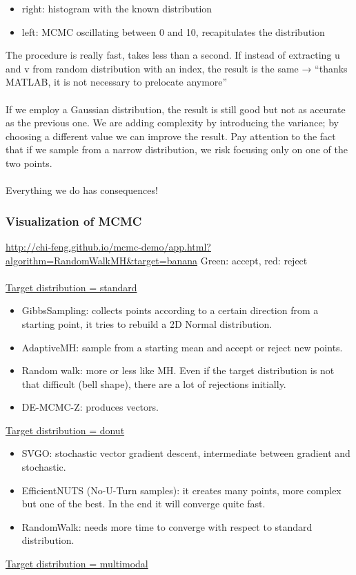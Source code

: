 \begin{itemize}
\tightlist
\item
  right: histogram with the known distribution
\item
  left: MCMC oscillating between 0 and 10, recapitulates the
  distribution
\end{itemize}
\noindent
The procedure is really fast, takes less than a second. If instead of
extracting u and v from random distribution with an index, the result is
the same → ``thanks MATLAB, it is not necessary to prelocate anymore''
\\
\\
\noindent
If we employ a Gaussian distribution, the result is still good but not
as accurate as the previous one. We are adding complexity by introducing
the variance; by choosing a different value we can improve the result.
Pay attention to the fact that if we sample from a narrow distribution,
we risk focusing only on one of the two points.
\\
\\
\noindent
Everything we do has consequences!


\subsubsection{Visualization of MCMC}

\url{http://chi-feng.github.io/mcmc-demo/app.html?algorithm=RandomWalkMH\&target=banana}
\noindent
Green: accept, red: reject
\\
\\
\noindent
\underline{Target distribution = standard}

\begin{itemize}
\tightlist
\item
  GibbsSampling: collects points according to a certain direction from a
  starting point, it tries to rebuild a 2D Normal distribution.
\item
  AdaptiveMH: sample from a starting mean and accept or reject new
  points.
\item
  Random walk: more or less like MH. Even if the target distribution is
  not that difficult (bell shape), there are a lot of rejections
  initially.
\item
  DE-MCMC-Z: produces vectors.
\end{itemize}
\noindent
\underline{Target distribution = donut}

\begin{itemize}
\tightlist
\item
  SVGO: stochastic vector gradient descent, intermediate between
  gradient and stochastic.
\item
  EfficientNUTS (No-U-Turn samples): it creates many points, more
  complex but one of the best. In the end it will converge quite fast.
\item
  RandomWalk: needs more time to converge with respect to standard
  distribution.
\end{itemize}
\noindent
\underline{Target distribution = multimodal}


